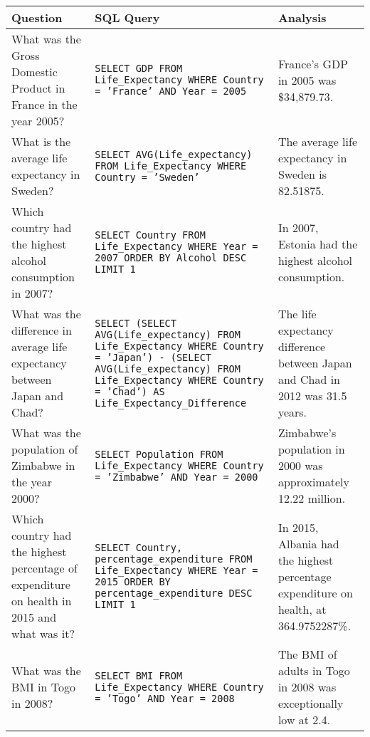 \documentclass[11pt]{article}
\begin{document}
\begin{table*}[t]
\centering
\begin{tabular}{|p{}|p{}|p{}|}
\hline
\textbf{Question} & \textbf{SQL Query} & \textbf{Analysis} \\ \hline

What was the Gross Domestic Product in France in the year 2005? & 
\texttt{SELECT GDP FROM Life\_Expectancy WHERE Country = 'France' AND Year = 2005} & 
France's GDP in 2005 was \$34,879.73. \\ \hline

What is the average life expectancy in Sweden? & 
\texttt{SELECT AVG(Life\_expectancy) FROM Life\_Expectancy WHERE Country = 'Sweden'} & 
The average life expectancy in Sweden is 82.51875. \\ \hline

Which country had the highest alcohol consumption in 2007? & 
\texttt{SELECT Country FROM Life\_Expectancy WHERE Year = 2007 ORDER BY Alcohol DESC LIMIT 1} & 
In 2007, Estonia had the highest alcohol consumption. \\ \hline

What was the difference in average life expectancy between Japan and Chad? & 
\texttt{SELECT (SELECT AVG(Life\_expectancy) FROM Life\_Expectancy WHERE Country = 'Japan') - (SELECT AVG(Life\_expectancy) FROM Life\_Expectancy WHERE Country = 'Chad') AS Life\_Expectancy\_Difference} & 
The life expectancy difference between Japan and Chad in 2012 was 31.5 years. \\ \hline

What was the population of Zimbabwe in the year 2000? & 
\texttt{SELECT Population FROM Life\_Expectancy WHERE Country = 'Zimbabwe' AND Year = 2000} & 
Zimbabwe’s population in 2000 was approximately 12.22 million. \\ \hline

Which country had the highest percentage of expenditure on health in 2015 and what was it? & 
\texttt{SELECT Country, percentage\_expenditure FROM Life\_Expectancy WHERE Year = 2015 ORDER BY percentage\_expenditure DESC LIMIT 1} & 
In 2015, Albania had the highest percentage expenditure on health, at 364.9752287\%. \\ \hline

What was the BMI in Togo in 2008? & 
\texttt{SELECT BMI FROM Life\_Expectancy WHERE Country = 'Togo' AND Year = 2008} & 
The BMI of adults in Togo in 2008 was exceptionally low at 2.4. \\ \hline


\end{tabular}
\end{table*}
\end{document}
